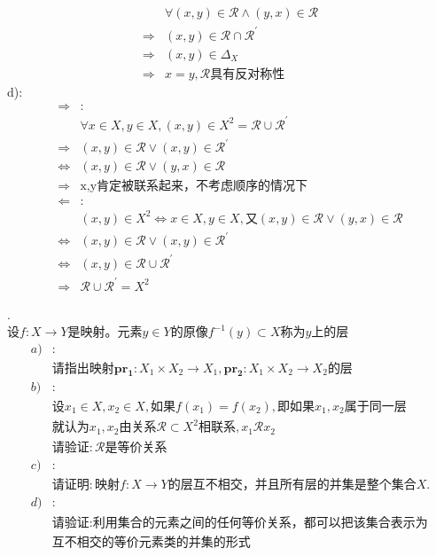 \begin{solution}
\begin{align*}
&\forall (x,y)\in \mathcal{R}\land (y,x)\in \mathcal{R}\\
\Rightarrow&(x,y)\in \mathcal{R}\cap \mathcal{R}^\prime\\
\Rightarrow& (x,y)\in \Delta_X\\
\Rightarrow&x=y,\mathcal{R}\text{具有反对称性}
\end{align*}
d):\\
\begin{align*}
\Rightarrow&:\\
&\forall x\in X,y\in X,(x,y)\in X^2=\mathcal{R}\cup \mathcal{R}^\prime\\
\Rightarrow&(x,y)\in \mathcal{R}\lor(x,y)\in \mathcal{R}^\prime\\
\Leftrightarrow&(x,y)\in \mathcal{R}\lor (y,x)\in \mathcal{R}\\
\Rightarrow&\text{x,y肯定被联系起来，不考虑顺序的情况下}\\
\Leftarrow&:\\
&(x,y)\in X^2\Leftrightarrow x\in X,y\in X,\text{又}(x,y)\in \mathcal{R}\lor (y,x)\in \mathcal{R}\\
\Leftrightarrow& (x,y) \in \mathcal{R}\lor (x,y)\in \mathcal{R}^\prime\\
\Leftrightarrow&(x,y)\in \mathcal{R}\cup \mathcal{R}^\prime\\
\Rightarrow&\mathcal{R}\cup \mathcal{R}^\prime=X^2
\end{align*}
\end{solution}
\newpage
\begin{exercise}.\\
    \label{def:b1-c1-s3-q2-layer}
    设$f:X\to Y$是映射。元素$y\in Y$的原像$f^{-1}(y)\subset X$称为$y$上的层\\
    \begin{align*}
    a)&:\\
    &\text{请指出映射}\mathbf{pr_1}: X_1\times X_2\to X_1,\mathbf{pr_2}: X_1\times X_2\to X_2 \text{的层}\\
    b)&:\\
    &\text{设}x_1\in X, x_2\in X,\text{如果}f(x_1)=f(x_2),\text{即如果}x_1,x_2\text{属于同一层}\\
    &\text{就认为}x_1,x_2\text{由关系}\mathcal{R}\subset X^2\text{相联系},x_1\mathcal{R}x_2\\
    &\text{请验证}:\mathcal{R}\text{是等价关系}\\
    c)&:\\
    &\text{请证明}:\text{映射}f:X\to Y\text{的层互不相交，并且所有层的并集是整个集合}X.\\
    d)&:\\
    &\text{请验证}:\text{利用集合的元素之间的任何等价关系，都可以把该集合表示为}\\
    &\text{互不相交的等价元素类的并集的形式}
    \end{align*}
\end{exercise}
